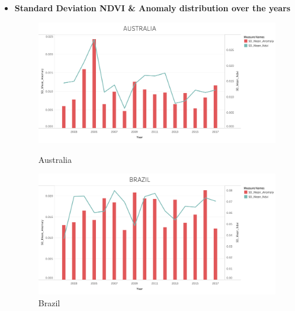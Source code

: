 \begin{itemize}
\newpage

\item \centerline{\textbf{Standard Deviation NDVI \& Anomaly distribution over the years}}

\begin{figure}[!htb]
        \begin{minipage}{0.5\textwidth}
            \centering
            \includegraphics[width=1.0\linewidth]{figures/ch5/StandardDeviation/AUSTRALIA_SD.png}
            \caption{Australia}\label{Fig:AUSTRALIA_SD}
        \end{minipage}\hfill
        \begin{minipage}{0.5\textwidth}
            \centering
            \includegraphics[width=1.0\linewidth]{figures/ch5/StandardDeviation/BRAZIL_SD.png}
            \caption{Brazil}\label{Fig:BRAZIL_SD}
        \end{minipage}
    \end{figure}
    

\end{itemize}
